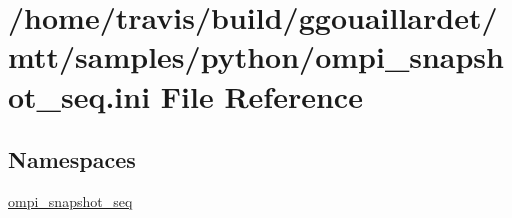 \hypertarget{ompi__snapshot__seq_8ini}{\section{/home/travis/build/ggouaillardet/mtt/samples/python/ompi\-\_\-snapshot\-\_\-seq.ini File Reference}
\label{ompi__snapshot__seq_8ini}
}
\subsection*{Namespaces}
\begin{DoxyCompactItemize}
\item 
\hyperlink{namespaceompi__snapshot__seq}{ompi\-\_\-snapshot\-\_\-seq}
\end{DoxyCompactItemize}
